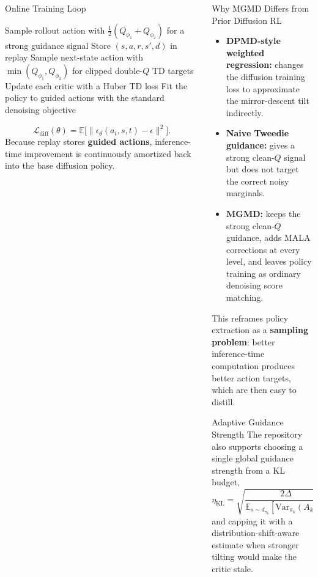 \documentclass[final,hyperref={pdfpagelabels=false}]{beamer}
\newlength{\colwidth}
\newcommand{\E}{\mathbb{E}}
\newcommand{\Var}{\mathrm{Var}}
\begin{document}
\begin{frame}[t]
\begin{columns}[t]
\begin{column}{\colwidth}
\begin{block}{\Large Online Training Loop}
\small
\begin{algorithmic}[1]
\STATE Sample rollout action with $\tfrac{1}{2}(Q_{\phi_1}+Q_{\phi_2})$ for a strong guidance signal
\STATE Store $(s,a,r,s',d)$ in replay
\STATE Sample next-state action with $\min(Q_{\phi_1},Q_{\phi_2})$ for clipped double-$Q$ TD targets
\STATE Update each critic with a Huber TD loss
\STATE Fit the policy to guided actions with the standard denoising objective
\end{algorithmic}
\[
\mathcal{L}_{\mathrm{diff}}(\theta)=\E\bigl[\|\epsilon_\theta(a_t,s,t)-\epsilon\|^2\bigr].
\]
Because replay stores \textbf{guided actions}, inference-time improvement is continuously amortized back into the base diffusion policy.
\end{block}
\end{column}

\begin{column}{\colwidth}
\begin{block}{\Large Why MGMD Differs from Prior Diffusion RL}
\small
\begin{itemize}
    \item \textbf{DPMD-style weighted regression:} changes the diffusion training loss to approximate the mirror-descent tilt indirectly.
    \item \textbf{Naive Tweedie guidance:} gives a strong clean-$Q$ signal but does not target the correct noisy marginals.
    \item \textbf{MGMD:} keeps the strong clean-$Q$ guidance, adds MALA corrections at every level, and leaves policy training as ordinary denoising score matching.
\end{itemize}

\vspace{0.3em}
This reframes policy extraction as a \textbf{sampling problem}: better inference-time computation produces better action targets, which are then easy to distill.
\end{block}

\vspace{0.8cm}

\begin{block}{\Large Adaptive Guidance Strength}
\small
The repository also supports choosing a single global guidance strength from a KL budget,
\[
\eta_{\mathrm{KL}}=\sqrt{\frac{2\Delta}{\E_{s\sim d_{\pi_k}}\![\Var_{\pi_k}(A_k)]}},
\]
and capping it with a distribution-shift-aware estimate when stronger tilting would make the critic stale.


\end{block}
\end{column}
\end{columns}
\end{frame}
\end{document}
